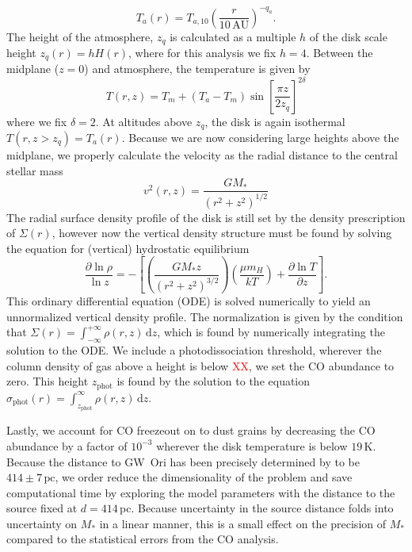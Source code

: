 \documentclass{aastex6}
\newcommand{\todo}[1]{ \textcolor{red}{#1}}
\begin{document}
\begin{equation}
	T_a(r) = T_{a,10} \left ( \frac{r}{10\,\textrm{AU}} \right )^{-q_a}.
\end{equation}
The height of the atmosphere, $z_q$ is calculated as a multiple $h$ of the disk scale height $z_q(r) = h H(r)$, where for this analysis we fix $h = 4$. Between the midplane ($z = 0$) and atmosphere, the temperature is given by
\begin{equation}
	T(r, z) = T_m + (T_a - T_m)  \sin \left [ \frac{\pi z}{2 z_q} \right ]^{2 \delta}
\end{equation}
where we fix $\delta = 2$. At altitudes above $z_q$, the disk is again isothermal $T(r, z > z_q) = T_a(r)$. Because we are now considering large heights above the midplane, we properly calculate the velocity as the radial distance to the central stellar mass
\begin{equation}
	v^2(r, z) = \frac{G M_\ast}{(r^2 + z^2)^{1/2}}
\end{equation}
The radial surface density profile of the disk is still set by the density prescription of $\Sigma(r)$, however now the vertical density structure must be found by solving the equation for (vertical) hydrostatic equilibrium
\begin{equation}
	\frac{\partial \ln \rho}{\ln z} = - \left [\left (\frac{G M_\ast z}{(r^2 + z^2)^{3/2}} \right) \left ( \frac{\mu m_H}{k T} \right ) + \frac{\partial \ln T}{\partial z} \right].
\end{equation}
This ordinary differential equation (ODE) is solved numerically to yield an unnormalized vertical density profile. The normalization is given by the condition that $\Sigma(r) = \int_{-\infty}^{+\infty} \rho(r, z)\, \mathrm{d}z$, which is found by numerically integrating the solution to the ODE. We include a photodissociation threshold, wherever the column density of gas above a height is below \todo{XX}, we set the CO abundance to zero. This height $z_\mathrm{phot}$ is found by the solution to the equation $\sigma_\mathrm{phot}(r) = \int_{z_\mathrm{phot}}^\infty \rho(r, z)\, \mathrm{d}z.$

Lastly, we account for CO freezeout on to dust grains by decreasing the CO abundance by a factor of $10^{-3}$ wherever the disk temperature is below $19\,$K. Because the distance to GW~Ori has been precisely determined by \citet{menten07} to be $414 \pm 7\,\textrm{pc}$, we order reduce the dimensionality of the problem and save computational time by exploring the model parameters with the distance to the source fixed at $d=414\,$pc. Because uncertainty in the source distance folds into uncertainty on $M_\ast$ in a linear manner, this is a small effect on the precision of $M_\ast$ compared to the statistical errors from the CO analysis.
\end{document}
